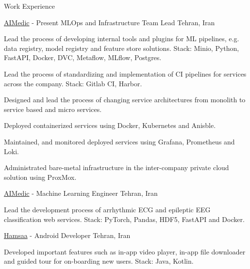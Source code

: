 \documentclass[../resume.tex]{subfiles}
\begin{document}
	\begin{rSection}{Work Experience}
		
		\begin{rSubsection}
			{\href{https://aimedic.co/}{AIMedic}}
			{  - Present }
			{MLOps and Infrastructure Team Lead}
			{Tehran, Iran}
			\item Lead the process of developing internal tools and plugins for ML pipelines, e.g. data registry, model registry and feature store solutions. Stack: Minio, Python, FastAPI, Docker, DVC, Metaflow, MLflow, Postgres.
			\item Lead the process of standardizing and implementation of CI pipelines for services across the company. Stack: Gitlab CI, Harbor.
			\item Designed and lead the process of changing service architectures from monolith to service based and micro services.
			\item Deployed containerized services using Docker, Kubernetes and Anisble.
			\item Maintained, and monitored deployed services using Grafana, Prometheus and Loki.
			\item Administrated bare-metal infrastructure in the inter-company private cloud solution using ProxMox.
			
		\end{rSubsection}
		
		\begin{rSubsection}
			{\href{https://aimedic.co}{AIMedic}}
			{  - \fmtdate{03}{2022} }
			{Machine Learning Engineer}
			{Tehran, Iran}

			\item Lead the development process of arrhythmic ECG and epileptic EEG classification web services. Stack: PyTorch, Pandas, HDF5, FastAPI and Docker.
			
		\end{rSubsection}
		
		\begin{rSubsection}
			{\href{https://hamsaa.ir}{Hamsaa}}
			{  - \fmtdate{11}{2019} }
			{Android Developer}
			{Tehran, Iran}
			
			\item Developed important features such as in-app video player, in-app file downloader and guided tour for on-boarding new users. Stack: Java, Kotlin.
			
		\end{rSubsection}
		
	
	\end{rSection}
\end{document}
